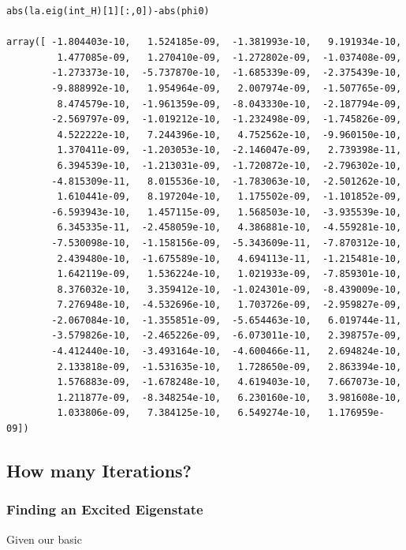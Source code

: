 \begin{verbatim}
abs(la.eig(int_H)[1][:,0])-abs(phi0)

array([ -1.804403e-10,   1.524185e-09,  -1.381993e-10,   9.191934e-10,
         1.477085e-09,   1.270410e-09,  -1.272802e-09,  -1.037408e-09,
        -1.273373e-10,  -5.737870e-10,  -1.685339e-09,  -2.375439e-10,
        -9.888992e-10,   1.954964e-09,   2.007974e-09,  -1.507765e-09,
         8.474579e-10,  -1.961359e-09,  -8.043330e-10,  -2.187794e-09,
        -2.569797e-09,  -1.019212e-10,  -1.232498e-09,  -1.745826e-09,
         4.522222e-10,   7.244396e-10,   4.752562e-10,  -9.960150e-10,
         1.370411e-09,  -1.203053e-10,  -2.146047e-09,   2.739398e-11,
         6.394539e-10,  -1.213031e-09,  -1.720872e-10,  -2.796302e-10,
        -4.815309e-11,   8.015536e-10,  -1.783063e-10,  -2.501262e-10,
         1.610441e-09,   8.197204e-10,   1.175502e-09,  -1.101852e-09,
        -6.593943e-10,   1.457115e-09,   1.568503e-10,  -3.935539e-10,
         6.345335e-11,  -2.458059e-10,   4.386881e-10,  -4.559281e-10,
        -7.530098e-10,  -1.158156e-09,  -5.343609e-11,  -7.870312e-10,
         2.439480e-10,  -1.675589e-10,   4.694113e-11,  -1.215481e-10,
         1.642119e-09,   1.536224e-10,   1.021933e-09,  -7.859301e-10,
         8.376032e-10,   3.359412e-10,  -1.024301e-09,  -8.439009e-10,
         7.276948e-10,  -4.532696e-10,   1.703726e-09,  -2.959827e-09,
        -2.067084e-10,  -1.355851e-09,  -5.654463e-10,   6.019744e-11,
        -3.579826e-10,  -2.465226e-09,  -6.073011e-10,   2.398757e-09,
        -4.412440e-10,  -3.493164e-10,  -4.600466e-11,   2.694824e-10,
         2.133818e-09,  -1.531635e-10,   1.728650e-09,   2.863394e-10,
         1.576883e-09,  -1.678248e-10,   4.619403e-10,   7.667073e-10,
         1.211877e-09,  -8.348254e-10,   6.230160e-10,   3.981608e-10,
         1.033806e-09,   7.384125e-10,   6.549274e-10,   1.176959e-09])
\end{verbatim}

\subsection{How many Iterations?}\label{how-many-iterations}

\subsubsection{Finding an Excited
Eigenstate}\label{finding-an-excited-eigenstate}

Given our basic
